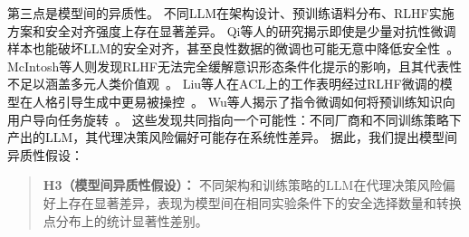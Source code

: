 第三点是模型间的异质性。
不同LLM在架构设计、预训练语料分布、RLHF实施方案和安全对齐强度上存在显著差异。
Qi等人的研究揭示即使是少量对抗性微调样本也能破坏LLM的安全对齐，甚至良性数据的微调也可能无意中降低安全性~\cite{Qi2024Finetuning}。
McIntosh等人则发现RLHF无法完全缓解意识形态条件化提示的影响，且其代表性不足以涵盖多元人类价值观~\cite{McIntosh2024Inadequacy}。
Liu等人在ACL上的工作表明经过RLHF微调的模型在人格引导生成中更易被操控~\cite{Liu2024Evaluating}。
Wu等人揭示了指令微调如何将预训练知识向用户导向任务旋转~\cite{Wu2024Language}。
这些发现共同指向一个可能性：不同厂商和不同训练策略下产出的LLM，其代理决策风险偏好可能存在系统性差异。
据此，我们提出模型间异质性假设：
\begin{quote}
\textbf{H3（模型间异质性假设）：} 不同架构和训练策略的LLM在代理决策风险偏好上存在显著差异，表现为模型间在相同实验条件下的安全选择数量和转换点分布上的统计显著性差别。
\end{quote}
